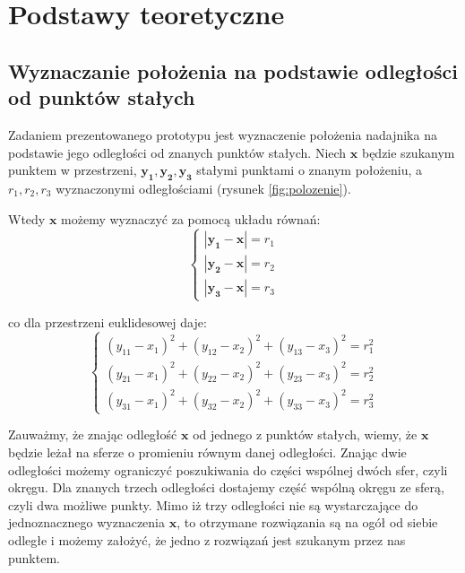 \chapter{Podstawy teoretyczne}
\section{Wyznaczanie położenia na podstawie odległości od punktów stałych}

Zadaniem prezentowanego prototypu jest wyznaczenie położenia nadajnika na podstawie jego 
odległości od znanych punktów stałych. Niech $\boldsymbol{x}$ będzie szukanym punktem w przestrzeni,
$\boldsymbol{y_1,y_2,y_3}$ stałymi punktami o znanym położeniu, a $r_1,r_2,r_3$ wyznaczonymi odległościami
(rysunek \ref{fig:polozenie}).

Wtedy $\boldsymbol{x}$ możemy wyznaczyć za pomocą układu równań:
\[
 \begin{cases}
    |\boldsymbol{y_1} - \boldsymbol{x}| = r_1
 \\ |\boldsymbol{y_2} - \boldsymbol{x}| = r_2
 \\ |\boldsymbol{y_3} - \boldsymbol{x}| = r_3
 \end{cases}
\]

co dla przestrzeni euklidesowej daje:
\[
 \begin{cases}
     (y_{11}-x_1)^2 + (y_{12}-x_2)^2 + (y_{13}-x_3)^2 = r_1^2
 \\  (y_{21}-x_1)^2 + (y_{22}-x_2)^2 + (y_{23}-x_3)^2 = r_2^2
 \\  (y_{31}-x_1)^2 + (y_{32}-x_2)^2 + (y_{33}-x_3)^2 = r_3^2
 \end{cases}
\]

Zauważmy, że znając odległość $\boldsymbol{x}$ od jednego z punktów stałych, wiemy, że $\boldsymbol{x}$ będzie leżał na
sferze o promieniu równym danej odległości. Znając dwie odległości możemy ograniczyć poszukiwania do części wspólnej dwóch sfer,
czyli okręgu. Dla znanych trzech odległości dostajemy część wspólną okręgu ze sferą, czyli dwa możliwe punkty.
Mimo iż trzy odległości nie są wystarczające do jednoznacznego wyznaczenia $\boldsymbol{x}$, 
to otrzymane rozwiązania są na ogół od siebie odległe i 
możemy założyć, że jedno z rozwiązań jest szukanym przez nas punktem.

